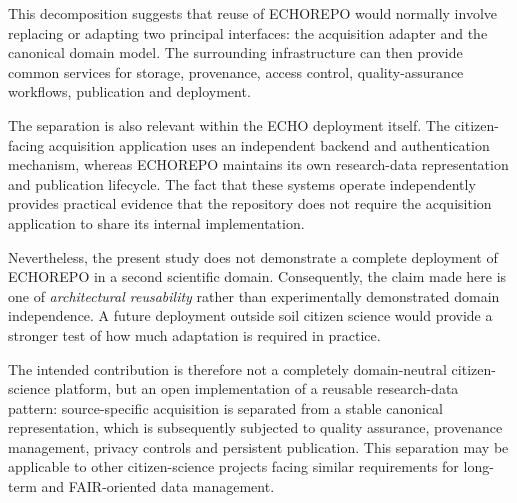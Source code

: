 This decomposition suggests that reuse of ECHOREPO would normally involve replacing or adapting two principal interfaces: the acquisition adapter and the canonical domain model. The surrounding infrastructure can then provide common services for storage, provenance, access control, quality-assurance workflows, publication and deployment.

The separation is also relevant within the ECHO deployment itself. The citizen-facing acquisition application uses an independent backend and authentication mechanism, whereas ECHOREPO maintains its own research-data representation and publication lifecycle. The fact that these systems operate independently provides practical evidence that the repository does not require the acquisition application to share its internal implementation.

Nevertheless, the present study does not demonstrate a complete deployment of ECHOREPO in a second scientific domain. Consequently, the claim made here is one of \emph{architectural reusability} rather than experimentally demonstrated domain independence. A future deployment outside soil citizen science would provide a stronger test of how much adaptation is required in practice.

The intended contribution is therefore not a completely domain-neutral
citizen-science platform, but an open implementation of a reusable
research-data pattern: source-specific acquisition is separated from a
stable canonical representation, which is subsequently subjected to
quality assurance, provenance management, privacy controls and persistent
publication. This separation may be applicable to other citizen-science
projects facing similar requirements for long-term and FAIR-oriented data
management.